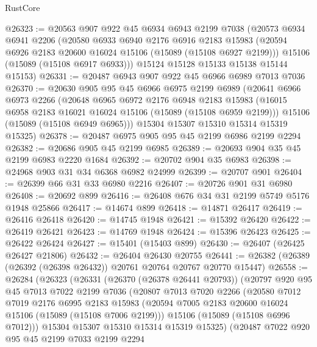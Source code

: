 \begin{lexlean}{RustCore}
\begin{coremodule}
@26323 := @20563
    @907
    @922
    @45
    @6934
    @6943
    @2199
    @7038
    (@20573
      @6934
      @6941
      @2206
      (@20580
        @6933
        @6940
        @2176
        @6916
        @2183
        @15983
        (@20594 @6926 @2183 @20600 @16024 @15106 (@15089 (@15108 @6927 @2199)))
        @15106
        (@15089 (@15108 @6917 @6933)))
      @15124
      @15128
      @15133
      @15138
      @15144
      @15153)
@26331 := @20487 @6943 @907 @922 @45 @6966 @6989 @7013 @7036
@26370 := @20630
    @905
    @95
    @45
    @6966
    @6975
    @2199
    @6989
    (@20641
      @6966
      @6973
      @2266
      (@20648
        @6965
        @6972
        @2176
        @6948
        @2183
        @15983
        (@16015 @6958 @2183 @16021 @16024 @15106 (@15089 (@15108 @6959 @2199)))
        @15106
        (@15089 (@15108 @6949 @6965)))
      @15304
      @15307
      @15310
      @15314
      @15319
      @15325)
@26378 := @20487 @6975 @905 @95 @45 @2199 @6986 @2199 @2294
@26382 := @20686 @905 @45 @2199 @6985
@26389 := @20693 @904 @35 @45 @2199 @6983 @2220 @1684
@26392 := @20702 @904 @35 @6983
@26398 := @24968 @903 @31 @34 @6368 @6982 @24999
@26399 := @20707 @901
@26404 := @26399 @66 @31 @33 @6980 @2216
@26407 := @20726 @901 @31 @6980
@26408 := @20692 @899
@26416 := @26408 @676 @34 @31 @2199 @5749 @5176 @1948 @25866
@26417 := @14674 @899
@26418 := @14871 @26417
@26419 := @26416 @26418
@26420 := @14745 @1948
@26421 := @15392 @26420
@26422 := @26419 @26421
@26423 := @14769 @1948
@26424 := @15396 @26423
@26425 := @26422 @26424
@26427 := @15401 (@15403 @899)
@26430 := @26407 (@26425 @26427 @21806)
@26432 := @26404 @26430 @20755
@26441 := @26382 (@26389 (@26392 (@26398 @26432)) @20761 @20764 @20767 @20770 @15447)
@26558 := @26284
    (@26323
      (@26331
        (@26370 (@26378 @26441 @20793))
        (@20797
          @920
          @95
          @45
          @7013
          @7022
          @2199
          @7036
          (@20807
            @7013
            @7020
            @2266
            (@20580
              @7012
              @7019
              @2176
              @6995
              @2183
              @15983
              (@20594 @7005 @2183 @20600 @16024 @15106 (@15089 (@15108 @7006 @2199)))
              @15106
              (@15089 (@15108 @6996 @7012)))
            @15304
            @15307
            @15310
            @15314
            @15319
            @15325)
          (@20487
            @7022
            @920
            @95
            @45
            @2199
            @7033
            @2199
            @2294

\end{coremodule}
\end{lexlean}
